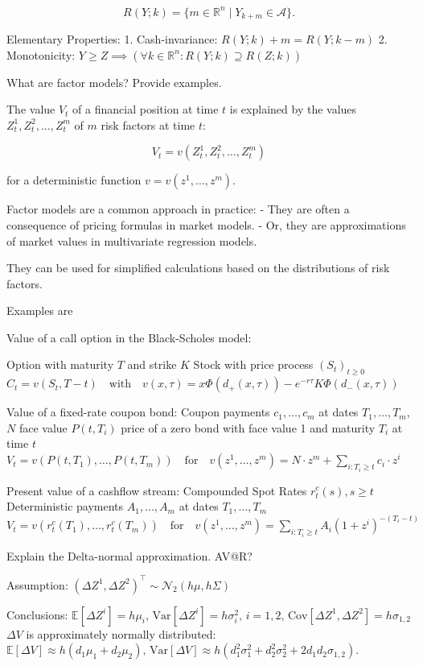 \[ R(Y; k) = \{ m \in \mathbb{R}^n \mid Y_{k+m} \in \mathcal{A} \}. \]

Elementary Properties:
1. Cash-invariance:  \( R(Y; k) + m = R(Y; k - m) \)
2. Monotonicity:  \( Y \geq Z \implies (\forall k \in \mathbb{R}^n: R(Y; k) \supseteq R(Z; k)) \)


What are factor models? Provide examples.

The value \( V_t \) of a financial position at time \( t \) is explained by the values 
\( Z_t^1, Z_t^2, \ldots, Z_t^m \) of \( m \) risk factors at time \( t \):

\[
V_t = v(Z_t^1, Z_t^2, \ldots, Z_t^m)
\]

for a deterministic function \( v = v(z^1, \ldots, z^m) \).

Factor models are a common approach in practice:
- They are often a consequence of pricing formulas in market models.
- Or, they are approximations of market values in multivariate regression models.

They can be used for simplified calculations based on the distributions of risk factors.

Examples are 

Value of a call option in the Black-Scholes model:

Option with maturity \( T \) and strike \( K \)
Stock with price process \( (S_t)_{t \geq 0} \)
\(
C_t = v(S_t, T - t) \quad \text{with} \quad v(x, \tau) = x \Phi(d_+(x, \tau)) - e^{-r \tau} K \Phi(d_-(x, \tau))
\)

Value of a fixed-rate coupon bond:
Coupon payments \( c_1, \ldots, c_m \) at dates \( T_1, \ldots, T_m \), \( N \) face value
\( P(t, T_i) \) price of a zero bond with face value 1 and maturity \( T_i \) at time \( t \)
\(
V_t = v(P(t, T_1), \ldots, P(t, T_m)) \quad \text{for} \quad v(z^1, \ldots, z^m) = N \cdot z^m + \sum_{i: T_i \geq t} c_i \cdot z^i
\)

Present value of a cashflow stream:
Compounded Spot Rates \( r_t^c(s), s \ge t \)
Deterministic payments \( A_1, \ldots, A_m \) at dates \( T_1, \ldots, T_m \)
\(
V_t = v(r_t^c(T_1), \ldots, r_t^c(T_m)) \quad \text{for} \quad v(z^1, \ldots, z^m) = \sum_{i: T_i \geq t} A_i (1 + z^i)^{-(T_i - t)}
\)

Explain the Delta-normal approximation.
AV@R?

Assumption:
\((\Delta Z^1, \Delta Z^2)^\top \sim \mathcal{N}_2(h\mu, h\Sigma)\)

Conclusions:
\(\mathbb{E}[\Delta Z^i] = h\mu_i, \, \text{Var}[\Delta Z^i] = h\sigma_i^2, \, i = 1, 2, \, \text{Cov}[\Delta Z^1, \Delta Z^2] = h\sigma_{1,2}\)
\(\Delta V\) is approximately normally distributed:
\(\mathbb{E}[\Delta V] \approx h(d_1\mu_1 + d_2\mu_2), \, \text{Var}[\Delta V] \approx h(d_1^2\sigma_1^2 + d_2^2\sigma_2^2 + 2d_1d_2\sigma_{1,2}).\)

